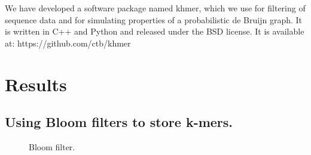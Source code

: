 \documentclass[12pt]{article} \usepackage{simplemargins}
\begin{document}
We have developed a software package named khmer, which we use for
filtering of sequence data and for simulating properties of a
probabilistic de Bruijn graph. It is written in C++ and Python and
released under the BSD license. It is available at:
https://github.com/ctb/khmer

\section{Results}

\subsection{Using Bloom filters to store k-mers.}


\begin{figure}
\caption{Bloom filter.}
\end{figure}
\end{document}
